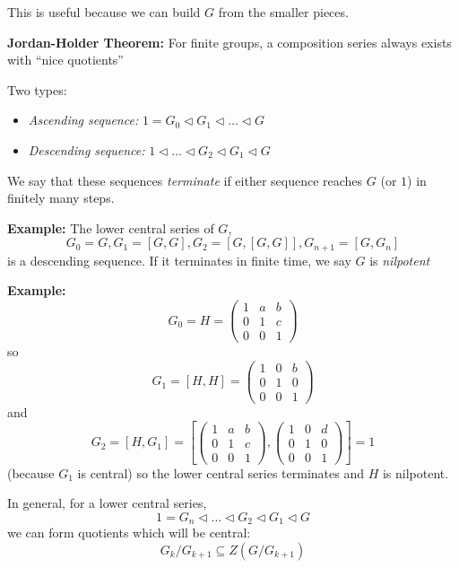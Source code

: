 \documentclass[12pt]{article}
\begin{document}
    This is useful because we can build $G$ from the smaller pieces. 

    \textbf{Jordan-Holder Theorem:} For finite groups, a composition series always exists with ``nice quotients'' 

    Two types:
    \begin{itemize}
        \item \emph{Ascending sequence:} $1  = G_0 \triangleleft G_1 \triangleleft \dots \triangleleft G$ 
        \item \emph{Descending sequence:} $1 \triangleleft \dots \triangleleft G_2 \triangleleft G_1 \triangleleft G$
    \end{itemize}

    We say that these sequences \emph{terminate} if either sequence reaches $G$ (or $1$) in finitely many steps. 

    \textbf{Example:} The lower central series of $G$, 
    \[G_0 = G, G_1 = [G, G], G_2 = [G, [G, G]], G_{n+1} = [G, G_n]\]
    is a descending sequence. If it terminates in finite time, we say $G$ is \emph{nilpotent}

    \textbf{Example:} 
    \[G_0 = H = \begin{pmatrix}
        1 & a & b\\ 
        0 & 1 & c\\ 
        0 & 0 & 1
    \end{pmatrix}\]
    so 
    \[G_1 = [H, H] = \begin{pmatrix}
        1 & 0 & b\\ 
        0 & 1 & 0\\ 
        0 & 0 & 1
    \end{pmatrix}\]
    and 
    \[G_2 = [H, G_1] = \left[\begin{pmatrix}
        1 & a & b\\ 
        0 & 1 & c\\ 
        0 & 0 & 1
    \end{pmatrix}, \begin{pmatrix}
        1 & 0 & d\\ 
        0 & 1 & 0\\ 
        0 & 0 & 1
    \end{pmatrix}\right] = 1\] 
    (because $G_1$ is central) so the lower central series terminates and $H$ is nilpotent. 

    In general, for a lower central series, 
    \[1 = G_n \triangleleft \dots \triangleleft G_2 \triangleleft G_1 \triangleleft G \]
    we can form quotients which will be central: 
    \[G_k/G_{k+1} \subseteq Z(G/G_{k+1})\]
\end{document}
